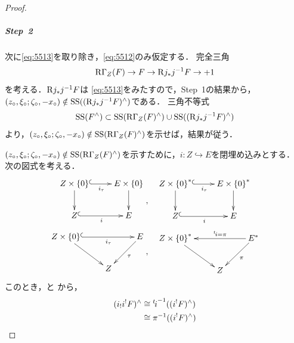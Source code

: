 \begin{proof}
    \subparagraph{Step~2}%
    次に\eqref{eq:5513}を取り除き，\eqref{eq:5512}のみ仮定する．
    完全三角\[
        \mathop{\mathrm{R}\hspace{-0pt}\Gamma}\nolimits_{Z}(F)\to F \to \mathrm{R}{j_{\ast}}j^{-1}F\to+1
    \]を考える．\(\mathrm{R}{j_{\ast}}j^{-1}F\)は
    \eqref{eq:5513}をみたすので，Step~1の結果から，
    \((z_{\circ},\xi_{\circ};\zeta_{\circ},-x_{\circ})
    \notin
    \mathop{\mathrm{SS}}\nolimits((\mathrm{R}{j_{\ast}}j^{-1}F)^{\wedge})\)である．
    三角不等式\[
        \mathop{\mathrm{SS}}\nolimits(F^{\wedge})            
        \subset
        \mathop{\mathrm{SS}}\nolimits(\mathop{\mathrm{R}\hspace{-0pt}\Gamma}\nolimits_{Z}(F)^{\wedge})            
        \cup
        \mathop{\mathrm{SS}}\nolimits((\mathrm{R}{j_{\ast}}j^{-1}F)^{\wedge})
    \]より，\(
        (z_{\circ},\xi_{\circ};\zeta_{\circ},-x_{\circ})
        \notin
        \mathop{\mathrm{SS}}\nolimits(\mathop{\mathrm{R}\hspace{-0pt}\Gamma}\nolimits_{Z}(F)^{\wedge})
    \)を示せば，結果が従う．

    \(
        (z_{\circ},\xi_{\circ};\zeta_{\circ},-x_{\circ})
        \notin
        \mathop{\mathrm{SS}}\nolimits(\mathop{\mathrm{R}\hspace{-0pt}\Gamma}\nolimits_{Z}(F)^{\wedge})
    \)を示すために，\(i\colon Z\hookrightarrow E\)を閉埋め込みとする．
    次の図式を考える．
    \begin{align*}
        \vcenter{\xymatrix{
        Z\times\left\{0\right\}
        \ar@{^{(}->}[r]_-{i_{\tau}}
        \ar[d]
        &
        E\times\left\{0\right\}
        \ar[d]\\
        Z
        \ar@{^{(}->}[r]_-{i}
        &
        E
    }},&\quad
    \vcenter{\xymatrix{
        Z\times\left\{0\right\}^{\ast}
        \ar@{^{(}->}[r]_-{i_{\tau}}
        \ar[d]
        &
        E\times\left\{0\right\}^{\ast}
        \ar[d]\\
        Z
        \ar@{^{(}->}[r]_-{i}
        &
        E
    }}\\
    \vcenter{\xymatrix{
        Z\times\left\{0\right\}
        \ar@{^{(}->}[rr]_-{i_{\tau}}
        \ar[rd]
        &&
        E
        \ar[ld]^-{\tau}\\
        &
        Z
        &
    }},&\quad
    \vcenter{\xymatrix{
        Z\times\left\{0\right\}^{\ast}
        \ar[rd]
        &&
        E^{\ast}
        \ar[ll]_-{\mtp[i]=\pi}
        \ar[ld]^-{\pi}\\
        &
        Z
        &
    }}        
    \end{align*}
    このとき，\cite[Prop.3.7.13,(i)]{KS90}と
    \cite[Prop.3.7.14,(i)]{KS90}から，
    \begin{align*}
        (i_{!}i^{!}F)^{\wedge}
        &\cong
        {\mtp[i]}^{-1}((i^{!}F)^{\wedge})\\
        &\cong
        \pi^{-1}((i^{!}F)^{\wedge})\\

\end{align*}
\end{proof}
